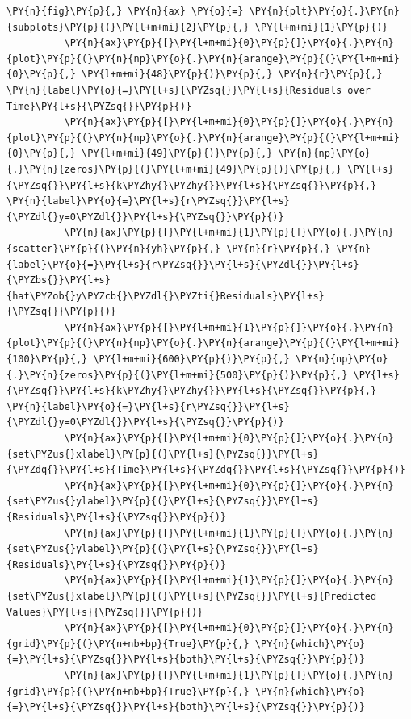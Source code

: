 \documentclass[10pt]{article}\usepackage[]{graphicx}\usepackage[]{xcolor}
\begin{document}
    \begin{Verbatim}[commandchars=\\\{\}]
 \PY{n}{fig}\PY{p}{,} \PY{n}{ax} \PY{o}{=} \PY{n}{plt}\PY{o}{.}\PY{n}{subplots}\PY{p}{(}\PY{l+m+mi}{2}\PY{p}{,} \PY{l+m+mi}{1}\PY{p}{)}
          \PY{n}{ax}\PY{p}{[}\PY{l+m+mi}{0}\PY{p}{]}\PY{o}{.}\PY{n}{plot}\PY{p}{(}\PY{n}{np}\PY{o}{.}\PY{n}{arange}\PY{p}{(}\PY{l+m+mi}{0}\PY{p}{,} \PY{l+m+mi}{48}\PY{p}{)}\PY{p}{,} \PY{n}{r}\PY{p}{,} \PY{n}{label}\PY{o}{=}\PY{l+s}{\PYZsq{}}\PY{l+s}{Residuals over Time}\PY{l+s}{\PYZsq{}}\PY{p}{)}
          \PY{n}{ax}\PY{p}{[}\PY{l+m+mi}{0}\PY{p}{]}\PY{o}{.}\PY{n}{plot}\PY{p}{(}\PY{n}{np}\PY{o}{.}\PY{n}{arange}\PY{p}{(}\PY{l+m+mi}{0}\PY{p}{,} \PY{l+m+mi}{49}\PY{p}{)}\PY{p}{,} \PY{n}{np}\PY{o}{.}\PY{n}{zeros}\PY{p}{(}\PY{l+m+mi}{49}\PY{p}{)}\PY{p}{,} \PY{l+s}{\PYZsq{}}\PY{l+s}{k\PYZhy{}\PYZhy{}}\PY{l+s}{\PYZsq{}}\PY{p}{,} \PY{n}{label}\PY{o}{=}\PY{l+s}{r\PYZsq{}}\PY{l+s}{\PYZdl{}y=0\PYZdl{}}\PY{l+s}{\PYZsq{}}\PY{p}{)}
          \PY{n}{ax}\PY{p}{[}\PY{l+m+mi}{1}\PY{p}{]}\PY{o}{.}\PY{n}{scatter}\PY{p}{(}\PY{n}{yh}\PY{p}{,} \PY{n}{r}\PY{p}{,} \PY{n}{label}\PY{o}{=}\PY{l+s}{r\PYZsq{}}\PY{l+s}{\PYZdl{}}\PY{l+s}{\PYZbs{}}\PY{l+s}{hat\PYZob{}y\PYZcb{}\PYZdl{}\PYZti{}Residuals}\PY{l+s}{\PYZsq{}}\PY{p}{)}
          \PY{n}{ax}\PY{p}{[}\PY{l+m+mi}{1}\PY{p}{]}\PY{o}{.}\PY{n}{plot}\PY{p}{(}\PY{n}{np}\PY{o}{.}\PY{n}{arange}\PY{p}{(}\PY{l+m+mi}{100}\PY{p}{,} \PY{l+m+mi}{600}\PY{p}{)}\PY{p}{,} \PY{n}{np}\PY{o}{.}\PY{n}{zeros}\PY{p}{(}\PY{l+m+mi}{500}\PY{p}{)}\PY{p}{,} \PY{l+s}{\PYZsq{}}\PY{l+s}{k\PYZhy{}\PYZhy{}}\PY{l+s}{\PYZsq{}}\PY{p}{,} \PY{n}{label}\PY{o}{=}\PY{l+s}{r\PYZsq{}}\PY{l+s}{\PYZdl{}y=0\PYZdl{}}\PY{l+s}{\PYZsq{}}\PY{p}{)}
          \PY{n}{ax}\PY{p}{[}\PY{l+m+mi}{0}\PY{p}{]}\PY{o}{.}\PY{n}{set\PYZus{}xlabel}\PY{p}{(}\PY{l+s}{\PYZsq{}}\PY{l+s}{\PYZdq{}}\PY{l+s}{Time}\PY{l+s}{\PYZdq{}}\PY{l+s}{\PYZsq{}}\PY{p}{)}
          \PY{n}{ax}\PY{p}{[}\PY{l+m+mi}{0}\PY{p}{]}\PY{o}{.}\PY{n}{set\PYZus{}ylabel}\PY{p}{(}\PY{l+s}{\PYZsq{}}\PY{l+s}{Residuals}\PY{l+s}{\PYZsq{}}\PY{p}{)}
          \PY{n}{ax}\PY{p}{[}\PY{l+m+mi}{1}\PY{p}{]}\PY{o}{.}\PY{n}{set\PYZus{}ylabel}\PY{p}{(}\PY{l+s}{\PYZsq{}}\PY{l+s}{Residuals}\PY{l+s}{\PYZsq{}}\PY{p}{)}
          \PY{n}{ax}\PY{p}{[}\PY{l+m+mi}{1}\PY{p}{]}\PY{o}{.}\PY{n}{set\PYZus{}xlabel}\PY{p}{(}\PY{l+s}{\PYZsq{}}\PY{l+s}{Predicted Values}\PY{l+s}{\PYZsq{}}\PY{p}{)}
          \PY{n}{ax}\PY{p}{[}\PY{l+m+mi}{0}\PY{p}{]}\PY{o}{.}\PY{n}{grid}\PY{p}{(}\PY{n+nb+bp}{True}\PY{p}{,} \PY{n}{which}\PY{o}{=}\PY{l+s}{\PYZsq{}}\PY{l+s}{both}\PY{l+s}{\PYZsq{}}\PY{p}{)}
          \PY{n}{ax}\PY{p}{[}\PY{l+m+mi}{1}\PY{p}{]}\PY{o}{.}\PY{n}{grid}\PY{p}{(}\PY{n+nb+bp}{True}\PY{p}{,} \PY{n}{which}\PY{o}{=}\PY{l+s}{\PYZsq{}}\PY{l+s}{both}\PY{l+s}{\PYZsq{}}\PY{p}{)}

\end{Verbatim}
\end{document}
